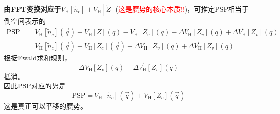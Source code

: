 \textbf{由FFT变换对应于$V_{\mathrm{H}}[\tilde{n}_c]+V_{\mathrm{H}}[\tilde{Z}]$}(\textcolor{red}{这是赝势的核心本质!!})，可推定\textrm{PSP}相当于倒空间表示的
\begin{equation}
	\begin{aligned}
		\mathrm{PSP}&=V_{\mathrm{H}}[\tilde{n}_c](\vec q)+V_{\mathrm{H}}[Z](q)-V_{\mathrm{H}}[Z_v](q)-\Delta V_{\mathrm{H}}[Z_v](q)+\Delta V_{\mathrm{H}}^{\prime}[Z_v](q)\\
		&=V_{\mathrm{H}}[\tilde{n}_c](\vec q)+V_{\mathrm{H}}[Z_c](\vec q)-\Delta V_{\mathrm{H}}[Z_v](q)+\Delta V_{\mathrm{H}}^{\prime}[Z_v](q)
	\end{aligned}
	\label{eq:PSP}
\end{equation}
根据\textrm{Ewald}求和规则，
\begin{displaymath}
	\Delta V_{\mathrm{H}}[Z_v](q)-\Delta V_{\mathrm{H}}^{\prime}[Z_v](q)
\end{displaymath}
抵消。\\
因此\textrm{PSP}对应的势是
\begin{displaymath}
	\mathrm{PSP} = V_{\mathrm{H}}[\tilde{n}_c](\vec q)+V_{\mathrm{H}}[Z_c](\vec q)
\end{displaymath}
这是真正可以平移的赝势。





